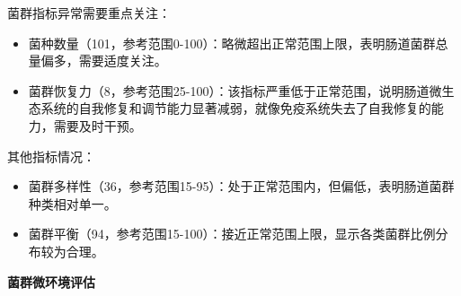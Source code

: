 \documentclass[UTF8]{ctexart}
\begin{document}
\begin{center}
\end{center}

\begin{tcolorbox}[
enhanced,
colback=gray!3,
colframe=gray!3,
arc=3mm,
boxrule=0pt,
width=\textwidth,
top=8pt,
bottom=8pt
]
{\small{\textcolor{yellow!85!orange}{\faLightbulb}}\quad 菌群指标异常需要重点关注：
\begin{itemize}
\item 菌种数量（101，参考范围0-100）：略微超出正常范围上限，表明肠道菌群总量偏多，需要适度关注。
\item 菌群恢复力（8，参考范围25-100）：该指标严重低于正常范围，说明肠道微生态系统的自我修复和调节能力显著减弱，就像免疫系统失去了自我修复的能力，需要及时干预。
\end{itemize}

{\textcolor{green!85!orange}{\faLightbulb}}\quad 其他指标情况：
\begin{itemize}
\item 菌群多样性（36，参考范围15-95）：处于正常范围内，但偏低，表明肠道菌群种类相对单一。
\item 菌群平衡（94，参考范围15-100）：接近正常范围上限，显示各类菌群比例分布较为合理。
\end{itemize}
}
\end{tcolorbox}



\newpage

\begin{tcolorbox}[
    enhanced,
    colback=white,
    colframe=white,
    arc=2mm,
    boxrule=0pt,
    width=\textwidth,
    left=15pt,
    right=15pt,
    top=10pt,
    bottom=10pt,
    drop shadow={
        opacity=0.2,
        color=customTeal
    },
    borderline west={5pt}{0pt}{customTeal}
]
\textcolor{customTeal}{\Large\textbf{菌群微环境评估}}
\end{tcolorbox}
\end{document}
